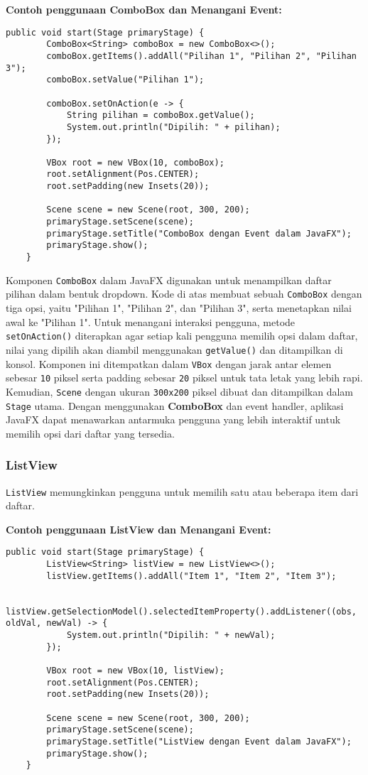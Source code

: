 \textbf{Contoh penggunaan ComboBox dan Menangani Event:}
\begin{lstlisting}[style=JavaStyle, caption=Membuat dan Menangani Event pada ComboBox dalam JavaFX]
	public void start(Stage primaryStage) {
		ComboBox<String> comboBox = new ComboBox<>();
		comboBox.getItems().addAll("Pilihan 1", "Pilihan 2", "Pilihan 3");
		comboBox.setValue("Pilihan 1");
		
		comboBox.setOnAction(e -> {
			String pilihan = comboBox.getValue();
			System.out.println("Dipilih: " + pilihan);
		});
		
		VBox root = new VBox(10, comboBox);
		root.setAlignment(Pos.CENTER);
		root.setPadding(new Insets(20));
		
		Scene scene = new Scene(root, 300, 200);
		primaryStage.setScene(scene);
		primaryStage.setTitle("ComboBox dengan Event dalam JavaFX");
		primaryStage.show();
	}
\end{lstlisting}

Komponen \texttt{ComboBox} dalam JavaFX digunakan untuk menampilkan daftar pilihan dalam bentuk dropdown. Kode di atas membuat sebuah \texttt{ComboBox} dengan tiga opsi, yaitu "Pilihan 1", "Pilihan 2", dan "Pilihan 3", serta menetapkan nilai awal ke "Pilihan 1". Untuk menangani interaksi pengguna, metode \texttt{setOnAction()} diterapkan agar setiap kali pengguna memilih opsi dalam daftar, nilai yang dipilih akan diambil menggunakan \texttt{getValue()} dan ditampilkan di konsol. Komponen ini ditempatkan dalam \texttt{VBox} dengan jarak antar elemen sebesar \texttt{10} piksel serta padding sebesar \texttt{20} piksel untuk tata letak yang lebih rapi. Kemudian, \texttt{Scene} dengan ukuran \texttt{300x200} piksel dibuat dan ditampilkan dalam \texttt{Stage} utama. Dengan menggunakan \textbf{ComboBox} dan event handler, aplikasi JavaFX dapat menawarkan antarmuka pengguna yang lebih interaktif untuk memilih opsi dari daftar yang tersedia.



\subsubsection{ListView}

\texttt{ListView} memungkinkan pengguna untuk memilih satu atau beberapa item dari daftar.

\textbf{Contoh penggunaan ListView dan Menangani Event:}
\begin{lstlisting}[style=JavaStyle, caption=Membuat dan Menangani Event pada ListView dalam JavaFX]
	public void start(Stage primaryStage) {
		ListView<String> listView = new ListView<>();
		listView.getItems().addAll("Item 1", "Item 2", "Item 3");
		
		listView.getSelectionModel().selectedItemProperty().addListener((obs, oldVal, newVal) -> {
			System.out.println("Dipilih: " + newVal);
		});
		
		VBox root = new VBox(10, listView);
		root.setAlignment(Pos.CENTER);
		root.setPadding(new Insets(20));
		
		Scene scene = new Scene(root, 300, 200);
		primaryStage.setScene(scene);
		primaryStage.setTitle("ListView dengan Event dalam JavaFX");
		primaryStage.show();
	}
\end{lstlisting}

